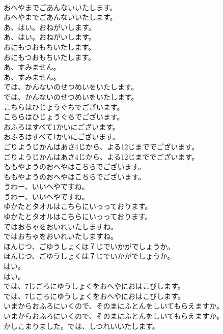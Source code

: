 \documentclass[8pt]{extreport}
\begin{document}
\begin{CJK}{UTF8}{min}
\\	おへやまでごあんないいたします。
\\	おへやまでごあんないいたします。
\\	あ、はい。おねがいします。
\\	あ、はい。おねがいします。
\\	おにもつおもちいたします。
\\	おにもつおもちいたします。
\\	あ、すみません。
\\	あ、すみません。
\\	では、かんないのせつめいをいたします。
\\	では、かんないのせつめいをいたします。
\\	こちらはひじょうぐちでございます。
\\	こちらはひじょうぐちでございます。
\\	おふろはすべて1かいにございます。
\\	おふろはすべて1かいにございます。
\\	ごりようじかんはあさ4じから、よる12じまででございます。
\\	ごりようじかんはあさ4じから、よる12じまででございます。
\\	ももやようのおへやはこちらでございます。
\\	ももやようのおへやはこちらでございます。
\\	うわー、いいへやですね。
\\	うわー、いいへやですね。
\\	ゆかたとタオルはこちらにいっっております。
\\	ゆかたとタオルはこちらにいっっております。
\\	ではおちゃをおいれいたしますね。
\\	ではおちゃをおいれいたしますね。
\\	ほんじつ、ごゆうしょくは７じでいかがでしょうか。
\\	ほんじつ、ごゆうしょくは７じでいかがでしょうか。
\\	はい。
\\	はい。
\\	では、7じごろにゆうしょくをおへやにおはこびします。
\\	では、7じごろにゆうしょくをおへやにおはこびします。
\\	いまからおふろにいくので、そのまにふとんをしいてもらえますか。
\\	いまからおふろにいくので、そのまにふとんをしいてもらえますか。
\\	かしこまりました。では、しつれいいたします。

\end{CJK}
\end{document}
